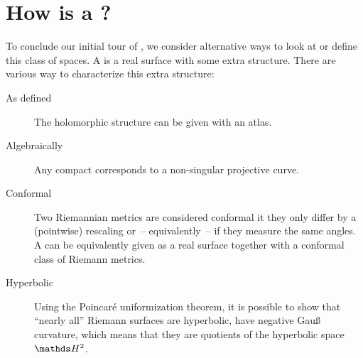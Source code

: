 \section{How is a \RS?}

To conclude our initial tour of \RSs,
we consider alternative ways
to look at or define this class of spaces.
A \RS is a real surface with some extra structure.
There are various way to characterize this extra structure:
\begin{description}
\item[As defined] The holomorphic structure can be given with an atlas.
\item[Algebraically] Any compact \RS
	corresponds to a non-singular projective curve.
\item[Conformal] Two Riemannian metrics are considered conformal
	it they only differ by a (pointwise) rescaling
	or~-- equivalently~-- if they measure the same angles.
	A \RS can be equivalently given
	as a real surface together with a conformal class of Riemann metrics.
\item[Hyperbolic] Using the Poincaré uniformization theorem,
	it is possible to show
	that “nearly all” Riemann surfaces are hyperbolic,
	\ie have negative Gauß curvature,
	which means that they are quotients of the hyperbolic space \(\H^2\).
\end{description}
